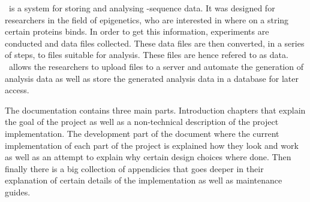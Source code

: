 \appName\ is a system for storing and analysing -sequence data. It was designed for researchers in the field of epigenetics, who are interested in where on a  string certain proteins binds. In order to get this information, experiments are conducted and  data files collected. These data files are then converted, in a series of steps, to files suitable for analysis. These files are hence refered to as  data. \appName\ allows the researchers to upload  files to a server and automate the generation of analysis data as well as store the generated analysis data in a database for later access. 


The documentation contains three main parts. Introduction chapters that explain the goal of the project as well as a non-technical description of the project implementation. The development part of the document where the current implementation of each part of the project is explained how they look and work as well as an attempt to explain why certain design choices where done. Then finally there is a big collection of appendicies that goes deeper in their explanation of certain details of the implementation as well as maintenance guides.

